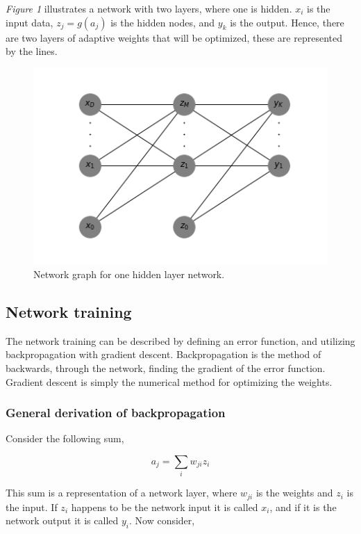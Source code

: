 \documentclass[12pt, letterpaper]{amsart}%
\begin{document}
\textit{Figure 1} illustrates a network with two layers, where one is hidden. $x_i$ is the input data, $z_j = g(a_j)$ is the hidden nodes, and $y_k$ is the output. Hence, there are two layers of adaptive weights that will be optimized, these are represented by the lines.

\begin{figure}%
\caption{Network graph for one hidden layer network.}
\centering
\includegraphics[scale=0.8]{Network.png}
\end{figure}


\subsection{Network training}
The network training can be described by defining an error function, and utilizing backpropagation with gradient descent. Backpropagation is the method of backwards, through the network, finding the gradient of the error function. Gradient descent is simply the numerical method for optimizing the weights.

\subsubsection{General derivation of backpropagation}
Consider the following sum,

\begin{equation}
    a_j = \sum_i w_{ji}z_i
\end{equation}

This sum is a representation of a network layer, where $w_{ji}$ is the weights and $z_i$ is the input. If $z_i$ happens to be the network input it is called $x_i$, and if it is the network output it is called $y_i$. Now consider,
\end{document}
